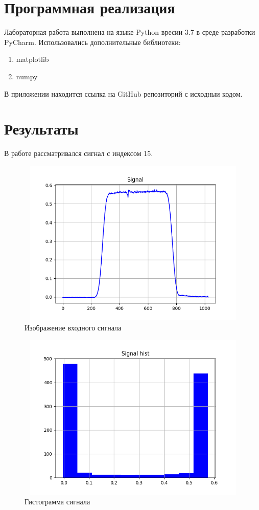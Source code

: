 \documentclass{article}
\begin{document}
\section{Программная реализация}
\noindent Лабораторная работа выполнена на языке Python вресии 3.7 в среде разработки PyCharm. Использовались дополнительные библиотеки:
 \begin{enumerate}
        \item matplotlib
        \item numpy 
    \end{enumerate}
В приложении находится ссылка на GitHub репозиторий с исходныи кодом.

\section{Результаты}
\noindent В работе рассматривался сигнал с индексом 15.
	\begin{figure}[H]
		\centering
		\includegraphics[width = 13cm, height = 8cm]{signal_plot.png}
		\caption{Изображение входного сигнала}
		\label{fig:sP}
	\end{figure}
	
		\begin{figure}[H]
		\centering
		\includegraphics[width = 13cm, height = 8cm]{hist.png}
		\caption{Гистограмма сигнала}
		\label{fig:sP}
	\end{figure}
	
\end{document}
